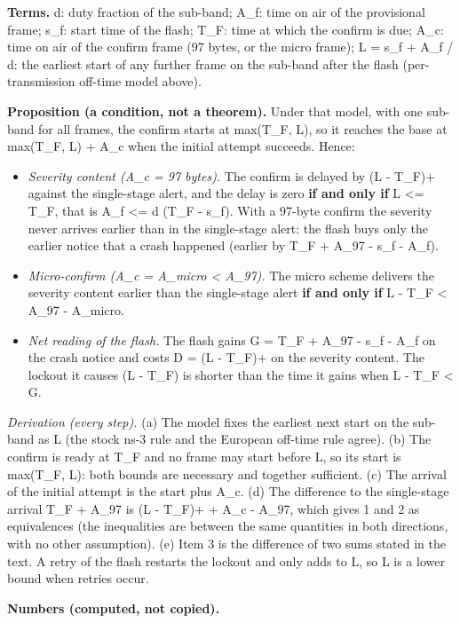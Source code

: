 \textbf{Terms.} d: duty fraction of the sub-band; A\_f: time on air of the provisional frame; s\_f: start time of the flash; T\_F: time at which the confirm is due; A\_c: time on air of the confirm frame (97 bytes, or the micro frame); L = s\_f + A\_f / d: the earliest start of any further frame on the sub-band after the flash (per-transmission off-time model above).

\textbf{Proposition (a condition, not a theorem).} Under that model, with one sub-band for all frames, the confirm starts at max(T\_F, L), so it reaches the base at max(T\_F, L) + A\_c when the initial attempt succeeds. Hence:
\begin{itemize}
\item \emph{Severity content (A\_c = 97 bytes).} The confirm is delayed by (L - T\_F)+ against the single-stage alert, and the delay is zero \textbf{if and only if} L <= T\_F, that is A\_f <= d (T\_F - s\_f). With a 97-byte confirm the severity never arrives earlier than in the single-stage alert: the flash buys only the earlier notice that a crash happened (earlier by T\_F + A\_97 - s\_f - A\_f).
\item \emph{Micro-confirm (A\_c = A\_micro < A\_97).} The micro scheme delivers the severity content earlier than the single-stage alert \textbf{if and only if} L - T\_F < A\_97 - A\_micro.
\item \emph{Net reading of the flash.} The flash gains G = T\_F + A\_97 - s\_f - A\_f on the crash notice and costs D = (L - T\_F)+ on the severity content. The lockout it causes (L - T\_F) is shorter than the time it gains when L - T\_F < G.
\end{itemize}

\emph{Derivation (every step).} (a) The model fixes the earliest next start on the sub-band as L (the stock ns-3 rule and the European off-time rule agree). (b) The confirm is ready at T\_F and no frame may start before L, so its start is max(T\_F, L): both bounds are necessary and together sufficient. (c) The arrival of the initial attempt is the start plus A\_c. (d) The difference to the single-stage arrival T\_F + A\_97 is (L - T\_F)+ + A\_c - A\_97, which gives 1 and 2 as equivalences (the inequalities are between the same quantities in both directions, with no other assumption). (e) Item 3 is the difference of two sums stated in the text. A retry of the flash restarts the lockout and only adds to L, so L is a lower bound when retries occur.

\textbf{Numbers (computed, not copied).}

